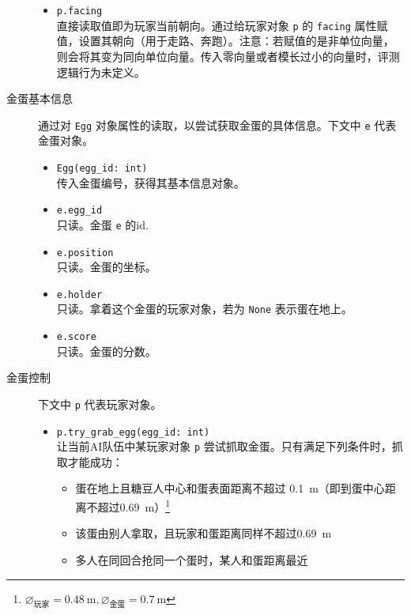 \documentclass{article}
\begin{document}
\begin{description}
\begin{itemize}
\item
\lstinline{p.facing}\\[-2pt]
直接读取值即为玩家当前朝向。通过给玩家对象 \lstinline{p} 的 \lstinline{facing} 属性赋值，设置其朝向（用于走路、奔跑）。注意：若赋值的是非单位向量，则会将其变为同向单位向量。传入零向量或者模长过小的向量时，评测逻辑行为未定义。

\end{itemize}

\item[金蛋基本信息] 通过对 \lstinline{Egg} 对象属性的读取，以尝试获取金蛋的具体信息。下文中 \lstinline{e} 代表金蛋对象。

\begin{itemize}
\item
\lstinline{Egg(egg_id: int)}\\[-2pt]
传入金蛋编号，获得其基本信息对象。

\item \lstinline{e.egg_id}\\[-2pt]
只读。金蛋 \lstinline{e} 的id.

\item \lstinline{e.position}\\[-2pt]
只读。金蛋的坐标。

\item \lstinline{e.holder}\\[-2pt]
只读。拿着这个金蛋的玩家对象，若为 \lstinline{None} 表示蛋在地上。

\item \lstinline{e.score}\\[-2pt]
只读。金蛋的分数。
\end{itemize}

\item[金蛋控制] 下文中 \lstinline{p} 代表玩家对象。

\begin{itemize}

\item
\lstinline{p.try_grab_egg(egg_id: int)}\\[-2pt]
让当前AI队伍中某玩家对象 \lstinline{p} 尝试抓取金蛋。只有满足下列条件时，抓取才能成功：
\begin{itemize}\setlength\itemsep{0em}
\item 蛋在地上且糖豆人中心和蛋表面距离不超过 \SI{0.1}{\meter}（即到蛋中心距离不超过\SI{0.69}{\meter}）\footnote{$\diameter_{\text{玩家}}=\SI{0.48}{\meter},\diameter_{\text{金蛋}}=\SI{0.7}{\meter}$}
\item 该蛋由别人拿取，且玩家和蛋距离同样不超过\SI{0.69}{\meter}
\item 多人在同回合抢同一个蛋时，某人和蛋距离最近
\end{itemize}


\end{itemize}
\end{description}
\end{document}
